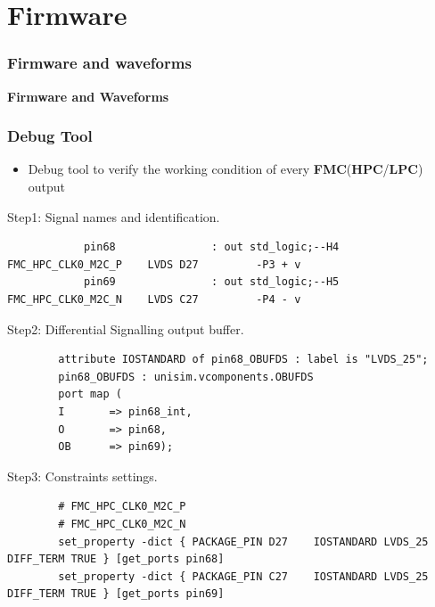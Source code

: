 \documentclass[aspectratio=169]{beamer}
\begin{document}
	
	\section{Firmware}
	
		\begin{frame}
	\frametitle{Firmware and waveforms}
	\begin{center}
		{\Huge {}\selectfont \color{blue} \textbf{Firmware and Waveforms}}
	\end{center}
	\end{frame}
	
	
	\begin{frame}[fragile]
	\frametitle{Debug Tool}
	\begin{itemize}
		\item Debug tool to verify the working condition of every \textbf{FMC}(\textbf{HPC}/\textbf{LPC}) output
	\end{itemize}
	\begin{center}
		{\small \color{blue} Step1: Signal names and identification.}
	\end{center}
	{\tiny
		\begin{verbatim}
			pin68				: out std_logic;--H4  FMC_HPC_CLK0_M2C_P    LVDS D27         -P3 + v
			pin69				: out std_logic;--H5  FMC_HPC_CLK0_M2C_N    LVDS C27         -P4 - v 
		\end{verbatim} }
	\begin{center}
		{\small \color{blue} Step2: Differential Signalling output buffer.}
	\end{center}
	{\tiny
		\begin{verbatim}
		attribute IOSTANDARD of pin68_OBUFDS : label is "LVDS_25";	
		pin68_OBUFDS : unisim.vcomponents.OBUFDS
		port map (
		I		=> pin68_int,
		O		=> pin68,
		OB		=> pin69);		
		\end{verbatim} }
	\begin{center}
		{\small \color{blue} Step3: Constraints settings.}
	\end{center}
	{\tiny
		\begin{verbatim}
		# FMC_HPC_CLK0_M2C_P
		# FMC_HPC_CLK0_M2C_N
		set_property -dict { PACKAGE_PIN D27	IOSTANDARD LVDS_25 DIFF_TERM TRUE }	[get_ports pin68]
		set_property -dict { PACKAGE_PIN C27	IOSTANDARD LVDS_25 DIFF_TERM TRUE }	[get_ports pin69]
		\end{verbatim} }
	\end{frame}
\end{document}
